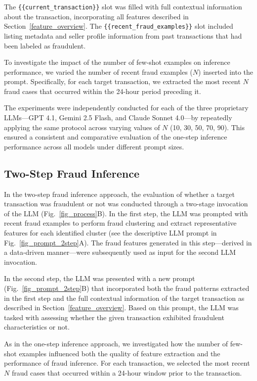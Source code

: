 \documentclass[sigconf]{acmart}
\begin{document}
The \texttt{\{\{current\_transaction\}\}} slot was filled with full contextual information about the transaction, incorporating all features described in Section~\ref{feature_overview}. The \texttt{\{\{recent\_fraud\_examples\}\}} slot included listing metadata and seller profile information from past transactions that had been labeled as fraudulent.

To investigate the impact of the number of few-shot examples on inference performance, we varied the number of recent fraud examples ($N$) inserted into the prompt. Specifically, for each target transaction, we extracted the most recent $N$ fraud cases that occurred within the 24-hour period preceding it. 

The experiments were independently conducted for each of the three proprietary LLMs—GPT 4.1, Gemini 2.5 Flash, and Claude Sonnet 4.0—by repeatedly applying the same protocol across varying values of $N$ (10, 30, 50, 70, 90). This ensured a consistent and comparative evaluation of the one-step inference performance across all models under different prompt sizes.






\subsection{Two-Step Fraud Inference}\label{two_step_inference}

In the two-step fraud inference approach, the evaluation of whether a target transaction was fraudulent or not  was conducted through a two-stage invocation of the LLM (Fig.~\ref{fig_process}B).
In the first step, the LLM was prompted with recent fraud examples to perform fraud clustering and extract representative features for each identified cluster (see the descriptive LLM prompt in Fig.~\ref{fig_prompt_2step}A). The fraud features generated in this step—derived in a data-driven manner—were subsequently used as input for the second LLM invocation.

In the second step, the LLM was presented with a new prompt (Fig.~\ref{fig_prompt_2step}B) that incorporated both the fraud patterns extracted in the first step and the full contextual information of the target transaction as described in Section~\ref{feature_overview}. Based on this prompt, the LLM was tasked with assessing whether the given transaction exhibited fraudulent characteristics or not.

As in the one-step inference approach, we investigated how the number of few-shot examples influenced both the quality of feature extraction and the performance of fraud inference. For each transaction, we selected the most recent $N$ fraud cases that occurred within a 24-hour window prior to the transaction. 
\end{document}
